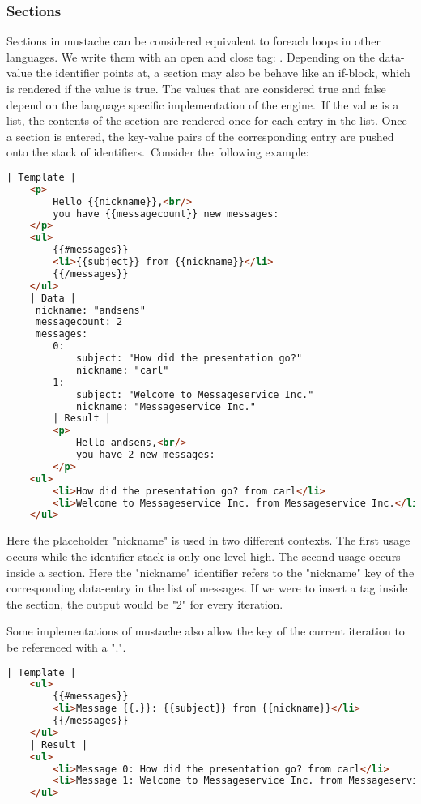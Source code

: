 \subsubsection{Sections}
Sections in mustache can be considered equivalent to foreach loops in other
languages. We write them with an open and close tag:
.
Depending on the data-value the identifier points at, a section may also be
behave like an if-block, which is rendered if the value is true. The values that
are considered true and false depend on the language specific implementation
of the engine.\
If the value is a list, the contents of the section are rendered once for each
entry in the list. Once a section is entered, the key-value pairs of the
corresponding entry are pushed onto the stack of identifiers.\
Consider the following example:
\label{fig:section-example.mustache}
\begin{lstlisting}[language=HTML]
	| Template |
	<p>
		Hello {{nickname}},<br/>
		you have {{messagecount}} new messages:
	</p>
	<ul>
		{{#messages}}
		<li>{{subject}} from {{nickname}}</li>
		{{/messages}}
	</ul>
	| Data |
	 nickname: "andsens"
	 messagecount: 2
	 messages:
	 	0:
	 		subject: "How did the presentation go?"
	 		nickname: "carl"
	 	1:
	 		subject: "Welcome to Messageservice Inc."
	 		nickname: "Messageservice Inc."
		| Result |
		<p>
			Hello andsens,<br/>
			you have 2 new messages:
		</p>
	<ul>
		<li>How did the presentation go? from carl</li>
		<li>Welcome to Messageservice Inc. from Messageservice Inc.</li>
	</ul>
\end{lstlisting}
Here the placeholder "nickname" is used in two different contexts.
The first usage occurs while the identifier stack is only one level high.
The second usage occurs inside a section. Here the "nickname" identifier refers
to the "nickname" key of the corresponding data-entry in the list of messages.
If we were to insert a \inline{\{\{messagecount\}\}} tag inside the section,
the output would be "2" for every iteration.

Some implementations of mustache also allow the key of the current iteration to
be referenced with a ".".
\begin{lstlisting}[language=HTML]
	| Template |
	<ul>
		{{#messages}}
		<li>Message {{.}}: {{subject}} from {{nickname}}</li>
		{{/messages}}
	</ul>
	| Result |
	<ul>
		<li>Message 0: How did the presentation go? from carl</li>
		<li>Message 1: Welcome to Messageservice Inc. from Messageservice Inc.</li>
	</ul>
\end{lstlisting}

